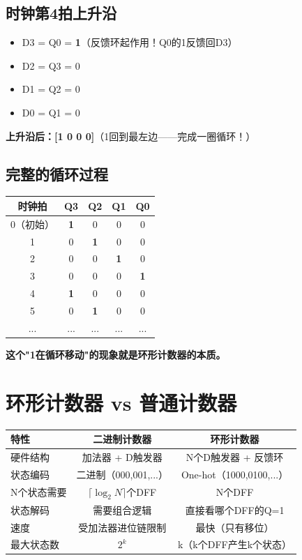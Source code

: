\subsection{时钟第4拍上升沿}

\begin{beatanalysis}
\begin{itemize}
  \item D3 = Q0 = \textbf{1}（反馈环起作用！Q0的1反馈回D3）
  \item D2 = Q3 = 0
  \item D1 = Q2 = 0
  \item D0 = Q1 = 0
\end{itemize}

\textbf{上升沿后：[1 0 0 0]}（1回到最左边——完成一圈循环！）
\end{beatanalysis}

\subsection{完整的循环过程}

\begin{center}
\begin{tabular}{|c|c|c|c|c|}
\hline
\textbf{时钟拍} & \textbf{Q3} & \textbf{Q2} & \textbf{Q1} & \textbf{Q0} \\
\hline
0（初始）& \textbf{1} & 0 & 0 & 0 \\
1 & 0 & \textbf{1} & 0 & 0 \\
2 & 0 & 0 & \textbf{1} & 0 \\
3 & 0 & 0 & 0 & \textbf{1} \\
4 & \textbf{1} & 0 & 0 & 0 \\
5 & 0 & \textbf{1} & 0 & 0 \\
... & ... & ... & ... & ... \\
\hline
\end{tabular}
\end{center}

\textbf{这个"1在循环移动"的现象就是环形计数器的本质。}

\section{环形计数器 vs 普通计数器}

\begin{center}
\begin{tabular}{|l|c|c|}
\hline
\textbf{特性} & \textbf{二进制计数器} & \textbf{环形计数器} \\
\hline
硬件结构 & 加法器 + D触发器 & N个D触发器 + 反馈环 \\
状态编码 & 二进制（000,001,...）& One-hot（1000,0100,...）\\
N个状态需要 & $\lceil\log_2 N\rceil$个DFF & N个DFF \\
状态解码 & 需要组合逻辑 & 直接看哪个DFF的Q=1 \\
速度 & 受加法器进位链限制 & 最快（只有移位） \\
最大状态数 & $2^k$ & k（k个DFF产生k个状态） \\
\hline
\end{tabular}
\end{center}

